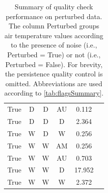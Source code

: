 \documentclass[authoryear,preprint,review,12pt]{elsarticle}
\begin{document}
\begin{table}[]
\begin{scriptsize}
\begin{tabular}{cccccc}
        True  & D  & D  & AU & 0.112  \\
        True  & D  & D  & D  & 2.364  \\
        True  & W  & D  & W  & 0.256  \\
        True  & W  & W  & AM & 0.256  \\
        True  & W  & W  & AU & 0.703  \\
        True  & W  & W  & D  & 17.952 \\
        True  & W  & W  & W  & 2.372  \\
        \bottomrule
    \end{tabular}
\end{scriptsize}
\caption{   Summary of quality check performance on perturbed data. 
            The column Perturbed groups air temperature values according to the presence of noise (i.e., Perturbed = True) or not (i.e., Perturbed = False).
            For brevity, the persistence quality control is omitted. 
            Abbreviations are used according to \cref{tab:flagsSummary}.}
\label{tab:validation_outcomes}
\end{table}
\end{document}
